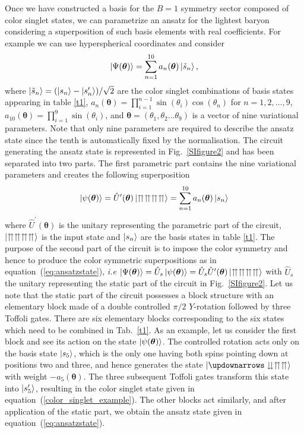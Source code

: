 \documentclass[twocolumn,aps,showpacs,prb,superscriptaddress,floatfix,10pt,nofootinbib]{revtex4-2}
\renewcommand{\eqref}[1]{equation~(\ref{#1})}
\begin{document}
Once we have constructed a basis for the $B=1$ symmetry sector composed of color singlet states, we can parametrize an ansatz for the lightest baryon considering a superposition of such basis elements with real coefficients. For example we can use hyperspherical coordinates and consider
\begin{equation}
\ket{\Psi(\boldsymbol{\theta})}=\sum_{n=1}^{10} a_{n}(\boldsymbol\theta)\ket{\tilde{s}_{n}}, \label{eq:ansatzstate}
\end{equation}
where $\ket{\tilde{s}_{n}}=(\ket{s_{n}}-\ket{s_{n}^{\prime}})/\sqrt{2}$ are the color singlet combinations of basis states appearing in table \ref{t1}, $a_{n}(\boldsymbol{\theta})=\prod_{i=1}^{n-1}\sin (\theta_{i})\cos(\theta_{n})$ for $n=1,2,\dots,9$, $a_{10}(\boldsymbol{\theta})=\prod_{i=1}^{9}\sin(\theta_{i})$, and $\boldsymbol{\theta}=(\theta_{1},\theta_{2}\dots \theta_{9})$ is a vector of nine variational parameters. Note that only nine parameters are required to describe the ansatz state since the tenth is automatically fixed by the normalisation. The circuit generating the ansatz state is represented in Fig.~\ref{SIfigure2} and has been separated into two parts. The first parametric part contains the nine variational parameters and creates the following superposition
\begin{equation}
\ket{\psi(\boldsymbol{\theta})}=\hat{U}^\prime(\boldsymbol{\theta})\ket{\upuparrows \upuparrows \upuparrows \upuparrows}=\sum_{n=1}^{10}a_{n}(\boldsymbol{\theta})\ket{s_{n}}
\end{equation}
where $\hat{U}^\prime(\boldsymbol{\theta})$ is the unitary representing the parametric part of the circuit, $\ket{\upuparrows \upuparrows \upuparrows \upuparrows}$ is the input state and $\ket{s_{n}}$ are the basis states in table \ref{t1}. The purpose of the second part of the circuit is to impose the color symmetry and hence to produce the color symmetric superpositions as in \eqref{eq:ansatzstate}, \textit{i.e} $\ket{\Psi(\boldsymbol{\theta})}=\hat{U}_{s}\ket{\psi(\boldsymbol{\theta})}=\hat{U}_{s}\hat{U}^\prime(\boldsymbol{\theta})\ket{\upuparrows \upuparrows \upuparrows \upuparrows}$ with $\hat{U}_{s}$ the unitary representing the static part of the circuit in Fig.~\ref{SIfigure2}. 
Let us note that the static part of the circuit possesses a block structure with an elementary block made of a double controlled $\pi/2$ $Y$-rotation followed by three Toffoli gates. There are six elementary blocks corresponding to the six states which need to be combined in Tab.~\ref{t1}. As an example, let us consider the first block and see its action on the state $\ket{\psi(\boldsymbol{\theta})}$. The controlled rotation acts only on the basis state $\ket{s_{5}}$, which is the only one having both spins pointing down at positions two and three, and hence generates the state $\ket{\updownarrows \downdownarrows \upuparrows \upuparrows }$ with weight $-a_{5}(\boldsymbol{\theta})$. The three subsequent Toffoli gates transform this state into $\ket{s_{5}^{\prime}}$, resulting in the color singlet state given in \eqref{color_singlet_example}. The other blocks act similarly, and after application of the static part, we obtain the ansatz state given in \eqref{eq:ansatzstate}. 
\end{document}
